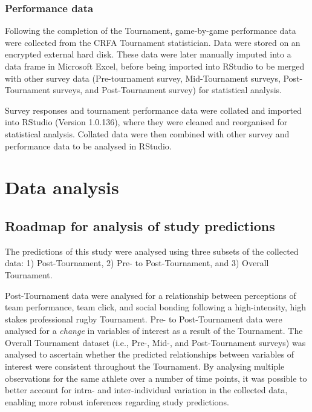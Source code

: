 \begin{CJK}{UTF8}{gbsn}
\subsubsection{Performance data}
Following the completion of the Tournament, game-by-game performance data were collected from the CRFA Tournament statistician.  Data were stored on an encrypted external hard disk. These data were later manually imputed into a data frame in Microsoft Excel, before being imported into RStudio to be merged with other survey data (Pre-tournament survey, Mid-Tournament surveys, Post-Tournament surveys, and Post-Tournament survey) for statistical analysis.

Survey responses and tournament performance data were collated and imported into RStudio (Version 1.0.136), where they were cleaned and reorganised for statistical analysis. Collated data were then combined with other survey and performance data to be analysed in RStudio.






\clearpage
\section{Data analysis}



\subsection{Roadmap for analysis of study predictions}
The predictions of this study were analysed using three subsets of the collected data: 1) Post-Tournament, 2) Pre- to Post-Tournament, and 3) Overall Tournament.

Post-Tournament data were analysed for a relationship between perceptions of team performance, team click, and social bonding following a high-intensity, high stakes professional rugby Tournament. Pre- to Post-Tournament data were analysed for a \textit{change} in variables of interest as a result of the Tournament.  The Overall Tournament dataset (i.e., Pre-, Mid-, and Post-Tournament surveys) was analysed to ascertain whether the predicted relationships between variables of interest were consistent throughout the Tournament.  By analysing multiple observations for the same athlete over a number of time points, it was possible to better account for intra- and inter-individual variation in the collected data, enabling more robust inferences regarding study predictions.


\end{CJK}
